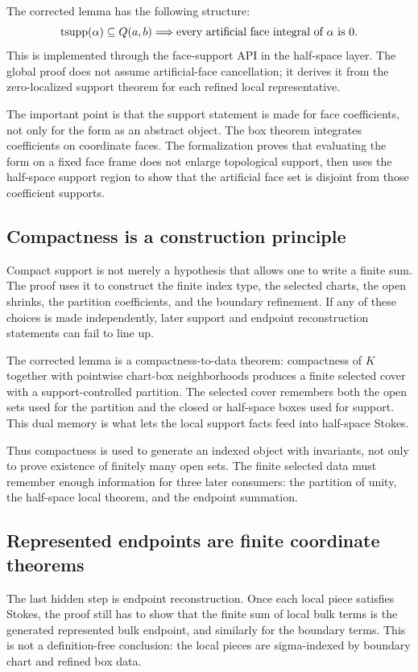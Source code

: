 The corrected lemma has the following structure:
\[
  \operatorname{tsupp}(\alpha)\subseteq Q(a,b)
  \Longrightarrow
  \text{every artificial face integral of }\alpha\text{ is }0.
\]
This is implemented through the face-support API in the half-space layer.  The
global proof does not assume artificial-face cancellation; it derives it from
the zero-localized support theorem for each refined local representative.

The important point is that the support statement is made for face
coefficients, not only for the form as an abstract object.  The box theorem
integrates coefficients on coordinate faces.  The formalization proves that
evaluating the form on a fixed face frame does not enlarge topological
support, then uses the half-space support region to show that the artificial
face set is disjoint from those coefficient supports.

\subsection{Compactness is a construction principle}

Compact support is not merely a hypothesis that allows one to write a finite
sum.  The proof uses it to construct the finite index type, the selected
charts, the open shrinks, the partition coefficients, and the boundary
refinement.  If any of these choices is made independently, later support and
endpoint reconstruction statements can fail to line up.

The corrected lemma is a compactness-to-data theorem: compactness of \(K\)
together with pointwise chart-box neighborhoods produces a finite selected
cover with a support-controlled partition.
The selected cover remembers both the open sets used for the partition and the
closed or half-space boxes used for support.  This dual memory is what lets the
local support facts feed into half-space Stokes.

Thus compactness is used to generate an indexed object with invariants, not
only to prove existence of finitely many open sets.  The finite selected data
must remember enough information for three later consumers: the partition of
unity, the half-space local theorem, and the endpoint summation.

\subsection{Represented endpoints are finite coordinate theorems}

The last hidden step is endpoint reconstruction.  Once each local piece
satisfies Stokes, the proof still has to show that the finite sum of local
bulk terms is the generated represented bulk endpoint, and similarly for the
boundary terms.  This is not a definition-free conclusion: the local pieces
are sigma-indexed by boundary chart and refined box data.

